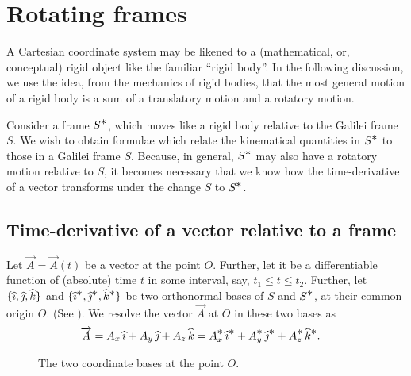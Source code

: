 \section{Rotating frames}
 A Cartesian coordinate system may  
be likened to a 
(mathematical, or, conceptual)  rigid object like the 
familiar ``rigid body''.  In the following discussion, we 
use the idea, from the mechanics of rigid bodies, that the 
most general motion of a rigid body is a sum of a 
translatory motion and a rotatory motion. 

Consider a frame $S^{{{\textstyle \ast}}}$, which moves like a rigid body 
relative to the Galilei frame $S$. We wish to obtain 
formulae which relate the kinematical quantities in  
$S^{\textstyle \ast}$ to those in a Galilei frame $S$. Because, in 
general, $S^{\textstyle \ast}$ may also have a rotatory motion 
relative to $S$, it becomes necessary that we  know how 
the time-derivative of a vector transforms under the change 
$S$ to $S^{{{\textstyle \ast}}}$. 

\subsection{Time-derivative of a vector relative to a frame} 
Let $\vec{A}=\vec{A}(t) $ be a vector at the point $O$. 
Further, let it be a differentiable function of (absolute) 
time $t$ in some interval, say, $ t_1 \leq t \leq t_2 $. 
Further, let $\{{\widehat{\imath}}, {\widehat{\jmath}},{\widehat{k}}\}$ and $ \{{\widehat{\imath}}^{\textstyle \ast} , 
{\widehat{\jmath}}^{\textstyle \ast} ,{\widehat{k}}^{\textstyle \ast} \}$ be two orthonormal bases of $S$ and 
$S^{\textstyle \ast}$, at their common origin $O$. (See ). 
 We resolve the vector $\vec{A}$ at $O$ in these two bases 
as
\begin{align*}
\overrightarrow{A} &=A_x\,{\widehat{\imath}} + A_y\,{\widehat{\jmath}}+A_z\,{\widehat{k}}=
A^{{\textstyle \ast}}_x\,{\widehat{\imath}}^{{\textstyle \ast}} +
A^{{\textstyle \ast}}_y\,{\widehat{\jmath}}^{{\textstyle \ast}}+A^{{\textstyle \ast}}_z\,{\widehat{k}}^{{\textstyle \ast}}.
\end{align*}
\begin{figure}[H]
\centering
{}
\caption{The two coordinate bases at the point 
$O$.}\label{fig2.1}
\end{figure}


